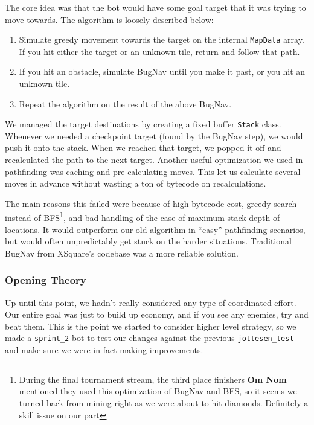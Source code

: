 The core idea was that the bot would have some goal target that it was trying to move towards. The algorithm is loosely described below:
\begin{enumerate}
  \item Simulate greedy movement towards the target on the internal \verb|MapData| array. If you hit either the target or an unknown tile, return and follow that path.
  \item If you hit an obstacle, simulate BugNav until you make it past, or you hit an unknown tile.
  \item Repeat the algorithm on the result of the above BugNav.
\end{enumerate}
We managed the target destinations by creating a fixed buffer \verb|Stack| class. Whenever we needed a checkpoint target (found by the BugNav step), we would push it onto the stack. When we reached that target, we popped it off and recalculated the path to the next target. Another useful optimization we used in pathfinding was caching and pre-calculating moves. This let us calculate several moves in advance without wasting a ton of bytecode on recalculations.

\medskip

The main reasons this failed were because of high bytecode cost, greedy search instead of BFS\footnote{During the final tournament stream, the third place finishers \textbf{Om Nom} mentioned they used this optimization of BugNav and BFS, so it seems we turned back from mining right as we were about to hit diamonds. Definitely a skill issue on our part}, and bad handling of the case of maximum stack depth of locations. It would outperform our old algorithm in ``easy'' pathfinding scenarios, but would often unpredictably get stuck on the harder situations. Traditional BugNav from XSquare's codebase was a more reliable solution.

\subsubsection{Opening Theory}

Up until this point, we hadn't really considered any type of coordinated effort. Our entire goal was just to build up economy, and if you see any enemies, try and beat them. This is the point we started to consider higher level strategy, so we made a \verb|sprint_2| bot to test our changes against the previous \verb|jottesen_test| and make sure we were in fact making improvements.

\medskip

